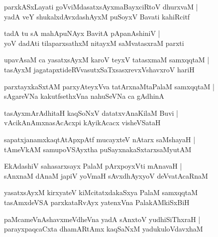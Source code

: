 \documentclass[twoside,12pt,openright]{book}
\newcounter{shloka}[chapter]
\begin{document}
\begin{shloka}%
parxkASxLayati goVviMdasatxsAyxmaBayxciRtoV dhurxvaM |\\
yadA veY shukalxdAvxdashAyxM puSoyxV Bavati kahiRcitf
\end{shloka}

\begin{shloka}%
tadA tu sA mahApuNAyx BavitA pApanAshiniV |\\
yoV dadAti tilaparxsathxM nitayxM saMvatasxraM parxti
\end{shloka}

\begin{shloka}%
upavAsaM ca yasatxsAyxM karoV teyxV tatasxmaM samxqqtaM |\\
tasAyxM jagatapxtideRVvasutxSaTxsasxrevxVshavxroV hariH
\end{shloka}

\begin{shloka}%
parxtayxkaSxtAM parxyAteyxVva tatArxnaMtaPalaM samxqqtaM |\\
sAgareVNa kakutfsethxVna nahuSeVNa ca gAdhinA
\end{shloka}

\begin{shloka}%
tasAyxmArAdhitaH kaqSoNxV datatxvAnaKilaM Buvi |\\
vAcikAnAmxnasAcAcxpi kAyikAcacx visheVSataH 
\end{shloka}

\begin{shloka}%
sapatxjanamxkaqtAtApxpAtf mucayxteV nAtarx saMshayaH |\\
tAmeVkAM samupoVSAyxtha puSayxnakaSxtarxsaMyutAM 
\end{shloka}

\begin{shloka}%
EkAdashiV sahasarxsayx PalaM pArxpoyxVti mAnavaH |\\
sAnxnaM dAnaM japiV yoVmaH sAvxdhAyxyoV deVvatAcaRnaM
\end{shloka}

\begin{shloka}%
yasatxsAyxM kirxyateV kiMcitatxdakaSxya PalaM samxqqtaM \\
tasAmxdeVSA parxkataRvAyx yatenxVna PalakAMkiSxBiH
\end{shloka}

\begin{shloka}%
paMcameVnAshavxmeVdheVna yadA sAnxtoV yudhiSiThxraH |\\
parayxpaqcaCxta dhamARtAmx kaqSaNxM yadukuloVdavxhaM 
\end{shloka}
\end{document}
